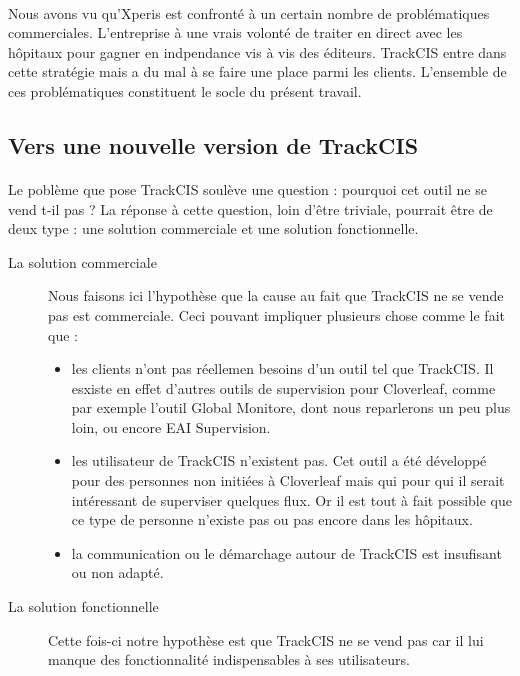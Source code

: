 			\paragraph{}%
			
			\paragraph{}
			Nous avons vu qu'Xperis est confronté à un certain nombre de problématiques
			commerciales. L'entreprise à une vrais volonté de traiter en direct avec les
			hôpitaux pour gagner en indpendance vis à vis des éditeurs. TrackCIS entre
			dans cette stratégie mais a du mal à se faire une place parmi les
			clients.\newline
			L'ensemble de ces problématiques constituent le socle du présent travail.
	
	\subsection{Vers une nouvelle version de TrackCIS}
		\paragraph{}%
		Le poblème que pose TrackCIS soulève une question : pourquoi cet outil ne se
		vend t-il pas ? La réponse à cette question, loin d'être triviale, pourrait
		être de deux type : une solution commerciale et une solution fonctionnelle.
		\begin{description}
			\item[La solution commerciale] Nous faisons ici l'hypothèse que la cause au
			fait que TrackCIS ne se vende pas est commerciale. Ceci pouvant impliquer
			plusieurs chose comme le fait que :
			\begin{itemize}
			  \item les clients n'ont pas réellemen besoins d'un outil tel que TrackCIS.
			  Il esxiste en effet d'autres outils de supervision pour Cloverleaf, comme
			  par exemple l'outil Global Monitore, dont nous reparlerons un peu plus
			  loin, ou encore EAI Supervision.
			  \item les utilisateur de TrackCIS n'existent pas. Cet outil a été développé
			  pour des personnes non initiées à Cloverleaf mais qui pour qui il serait
			  intéressant de superviser quelques flux.
			  Or il est tout à fait possible que ce type de personne n'existe pas ou pas
			  encore dans les hôpitaux.
			  \item la communication ou le démarchage autour de TrackCIS est insufisant
			  ou non adapté.
			\end{itemize}
			\item[La solution fonctionnelle] Cette fois-ci notre hypothèse est que
			TrackCIS ne se vend pas car il lui manque des fonctionnalité indispensables à
			ses utilisateurs.
		\end{description}
		
